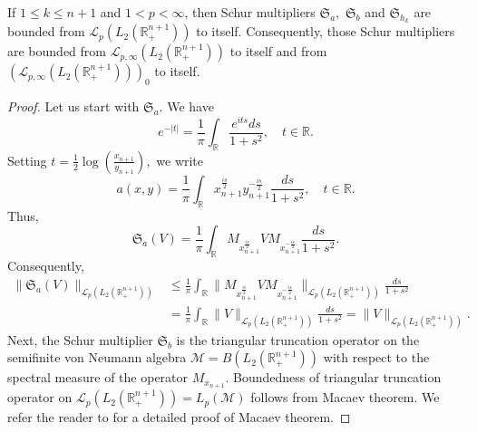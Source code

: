 \documentclass[12pt]{amsart}
\begin{document}
\begin{proposition}\label{standard schur lemma}
If $1\leq k\leq n+1$ and $1<p<\infty$, then Schur multipliers $\mathfrak{S}_a,$ $\mathfrak{S}_b$ and $\mathfrak{S}_{h_k}$ are bounded from $\mathcal{L}_p(L_2(\mathbb{R}^{n+1}_+))$ to itself. Consequently, those Schur multipliers are bounded from $\mathcal{L}_{p,\infty}(L_2(\mathbb{R}^{n+1}_+))$ to itself and from $(\mathcal{L}_{p,\infty}(L_2(\mathbb{R}^{n+1}_+)))_0$ to itself.
\end{proposition}
\begin{proof} Let us start with $\mathfrak{S}_a.$ We have
$$e^{-|t|}=\frac1{\pi}\int_{\mathbb{R}}\frac{e^{its}ds}{1+s^2},\quad t\in\mathbb{R}.$$
Setting $t=\frac{1}{2}\log(\frac{x_{n+1}}{y_{n+1}}),$ we write
$$a(x,y)=\frac1{\pi}\int_{\mathbb{R}}x_{n+1}^{\frac{is}{2}}y_{n+1}^{-\frac{is}{2}}\frac{ds}{1+s^2},\quad t\in\mathbb{R}.$$
Thus,
$$\mathfrak{S}_a(V)=\frac1{\pi}\int_{\mathbb{R}}M_{x_{n+1}^{\frac{is}{2}}}VM_{x_{n+1}^{-\frac{is}{2}}}\frac{ds}{1+s^2}.$$
Consequently,
\begin{align*}
\|\mathfrak{S}_a(V)\|_{\mathcal{L}_p(L_2(\mathbb{R}^{n+1}_+))}&\leq\frac1{\pi}\int_{\mathbb{R}}\|M_{x_{n+1}^{\frac{is}{2}}}VM_{x_{n+1}^{-\frac{is}{2}}}\|_{\mathcal{L}_p(L_2(\mathbb{R}^{n+1}_+))}\frac{ds}{1+s^2}\\
&=\frac1{\pi}\int_{\mathbb{R}}\|V\|_{\mathcal{L}_p(L_2(\mathbb{R}^{n+1}_+))}\frac{ds}{1+s^2}=\|V\|_{\mathcal{L}_p(L_2(\mathbb{R}^{n+1}_+))}.
\end{align*}
Next, the Schur multiplier $\mathfrak{S}_b$ is the triangular truncation operator on the semifinite von Neumann algebra $\mathcal{M}=B(L_2(\mathbb{R}^{n+1}_+))$ with respect to the spectral measure of the operator $M_{x_{n+1}}.$ Boundedness of triangular truncation operator on
$\mathcal{L}_p(L_2(\mathbb{R}^{n+1}_+))=L_p(\mathcal{M})$ follows from Macaev theorem. We refer the reader to \cite{MSZ-krein} for a detailed proof of Macaev theorem.


\end{proof}
\end{document}
